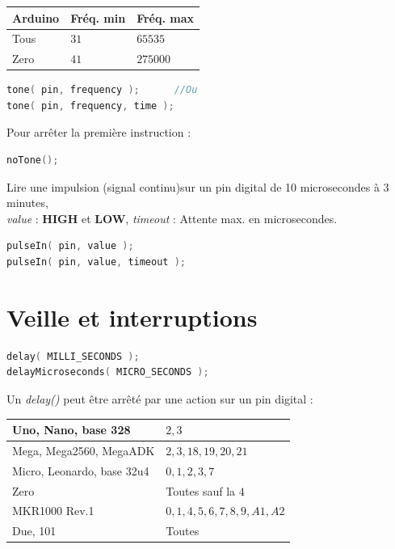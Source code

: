             \begin{center}
                 \begin{tabular}{| l | l | l |}
                    \hline
                        Arduino & Fréq. min & Fréq. max \\
                    \hline
                        Tous & $31$ & $65535$ \\
                        Zero & $41$ & $275000$ \\
                    \hline
                \end{tabular}
            \end{center}
            \begin{lstlisting}[language=C]
tone( pin, frequency );      //Ou
tone( pin, frequency, time );
            \end{lstlisting}

            \bmar
                Pour arrêter la première instruction :
            \emar
            \begin{lstlisting}[language=C]
noTone();
            \end{lstlisting}


            \bmar
                Lire une impulsion (signal continu)sur un pin digital de 10 microsecondes à 3 minutes,\\
                \textit{value} : \textbf{HIGH} et \textbf{LOW}, \textit{timeout} : Attente max. en microsecondes.
            \emar
            \begin{lstlisting}[language=C]
pulseIn( pin, value );
pulseIn( pin, value, timeout );
            \end{lstlisting}

    \section{Veille et interruptions}
        \begin{lstlisting}[language=C]
delay( MILLI_SECONDS );
delayMicroseconds( MICRO_SECONDS );
        \end{lstlisting}
        \bmar
            Un \textit{delay()} peut être arrêté par une action sur un pin digital :
        \emar

        \begin{center}
            \begin{tabular}{| l | l |}
                \hline
                    Uno, Nano, base 328 & $2, 3$\\
                \hline
                    Mega, Mega2560, MegaADK & $2, 3, 18, 19, 20, 21$\\
                \hline
                    Micro, Leonardo, base 32u4 & $0, 1, 2, 3, 7$\\
                \hline
                    Zero & Toutes sauf la $4$\\
                \hline
                    MKR1000 Rev.1 & $0, 1, 4, 5, 6, 7, 8, 9, A1, A2$\\
                \hline
                    Due, 101 & Toutes\\
                \hline
            \end{tabular}
        \end{center}

